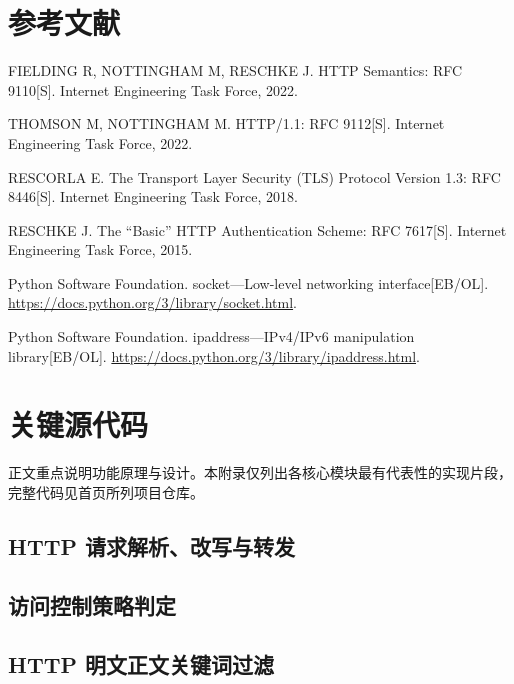 \documentclass[UTF8,a4paper,10.5pt,fontset=windows]{ctexart}
\begin{document}
\section*{参考文献}
\begin{enumerate}[label={[\arabic*]},leftmargin=2.5em,itemsep=0.2em]
\item FIELDING R, NOTTINGHAM M, RESCHKE J. HTTP Semantics: RFC 9110[S]. Internet Engineering Task Force, 2022.
\item THOMSON M, NOTTINGHAM M. HTTP/1.1: RFC 9112[S]. Internet Engineering Task Force, 2022.
\item RESCORLA E. The Transport Layer Security (TLS) Protocol Version 1.3: RFC 8446[S]. Internet Engineering Task Force, 2018.
\item RESCHKE J. The ``Basic'' HTTP Authentication Scheme: RFC 7617[S]. Internet Engineering Task Force, 2015.
\item Python Software Foundation. socket---Low-level networking interface[EB/OL]. \url{https://docs.python.org/3/library/socket.html}.
\item Python Software Foundation. ipaddress---IPv4/IPv6 manipulation library[EB/OL]. \url{https://docs.python.org/3/library/ipaddress.html}.
\end{enumerate}

\appendix
\section{关键源代码}

正文重点说明功能原理与设计。本附录仅列出各核心模块最有代表性的实现片段，完整代码见首页所列项目仓库。

\subsection{HTTP 请求解析、改写与转发}
\label{app:forward}



\subsection{访问控制策略判定}
\label{app:policy}



\subsection{HTTP 明文正文关键词过滤}
\label{app:content}
\end{document}
